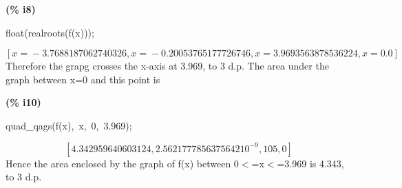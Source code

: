 \documentclass[fleqn]{article}
\begin{document}
\noindent
\begin{minipage}[t]{4.000000em}\color{red}\bfseries
(\% i8)	
\end{minipage}
\begin{minipage}[t]{\textwidth}\color{blue}
float(realroots(f(x)));
\end{minipage}
\[\displaystyle \tag{\% o8} 
\mathop{[}x\mathop{=}\mathop{-}3.7688187062740326\mathop{,}x\mathop{=}\mathop{-}0.20053765177726746\mathop{,}x\mathop{=}3.9693563878536224\mathop{,}x\mathop{=
}0.0\mathop{]}\mbox{}
\]
Therefore the grapg crosses the x-axis at 3.969, to 3 d.p.
The area under the graph between x=0 and this point is


\noindent
\begin{minipage}[t]{4.000000em}\color{red}\bfseries
(\% i10)	
\end{minipage}
\begin{minipage}[t]{\textwidth}\color{blue}
quad\_qags(f(x),\ x,\ 0,\ 3.969);
\end{minipage}
\[\displaystyle \tag{\% o10} 
\left[ 4.342959640603124\mathop{,}2.5621777856375642 {{10}^{-9}}\mathop{,}105\mathop{,}0\right] \mbox{}
\]
Hence the area enclosed by the graph of f(x) between 0\ensuremath{<}=x\ensuremath{<}=3.969 is 4.343, to 3 d.p.
\end{document}
